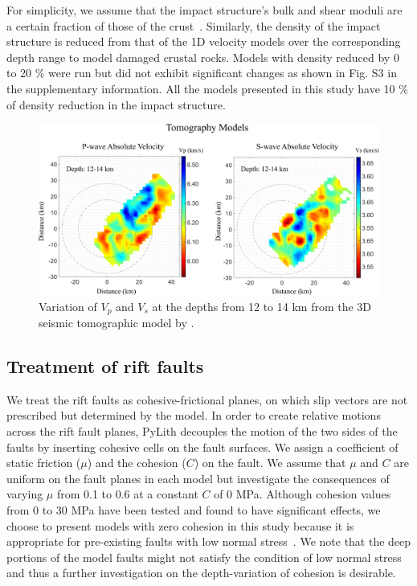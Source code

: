 \documentclass[draft]{agujournal2018}
\begin{document}
For simplicity, we assume that the impact structure's bulk and shear moduli are a certain fraction of those of the crust~\citep[e.g.,][]{Baird_2010}. Similarly, the density of the impact structure is reduced from that of the 1D velocity models over the corresponding depth range to model damaged crustal rocks. Models with density reduced by 0 to 20 \% were run but did not exhibit significant changes as shown in Fig. S3 in the supplementary information. All the models presented in this study have 10 \% of density reduction in the impact structure.

\begin{figure}[ht]
\centering
\includegraphics[width=30pc]{Figures/TOMO_vel_models.png}
\caption{Variation of $V_p$ and $V_s$ at the depths from 12 to 14 km from the 3D seismic tomographic model by \citet{Powell_2017}.}
\label{figfour}
\end{figure}

\subsection{Treatment of rift faults}
We treat the rift faults as cohesive-frictional planes, on which slip vectors are not prescribed but determined by the model. In order to create relative motions across the rift fault planes, PyLith decouples the motion of the two sides of the faults by inserting cohesive cells on the fault surfaces. We assign a coefficient of static friction ($\mu$) and the cohesion ($C$) on the fault. We assume that $\mu$ and $C$ are uniform on the fault planes in each model but investigate the consequences of varying $\mu$ from 0.1 to 0.6 at a constant $C$ of 0 MPa. Although cohesion values from 0 to 30 MPa have been tested and found to have significant effects, we choose to present models with zero cohesion in this study because it is appropriate for pre-existing faults with low normal stress~\citep[e.g.,][]{Marone_Chris}. We note that the deep portions of the model faults might not satisfy the condition of low normal stress and thus a further investigation on the depth-variation of cohesion is desirable.
\end{document}
